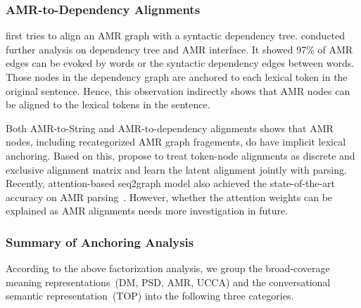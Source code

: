 \subsubsection{AMR-to-Dependency Alignments}
\label{sssec:lex-phr:amr-dep}
\citet{chen2017unsupervised} first tries to align an AMR graph with a
syntactic dependency tree.  \citet{szubert2018structured} conducted
further analysis on dependency tree and AMR interface. It showed 97\%
of AMR edges can be evoked by words or the syntactic dependency edges
between words.  Those nodes in the dependency graph are anchored to
each lexical token in the original sentence. Hence, this observation
indirectly shows that AMR nodes can be aligned to the lexical tokens
in the sentence.

Both AMR-to-String and AMR-to-dependency alignments shows that AMR
nodes, including recategorized AMR graph fragements, do have implicit
lexical anchoring. Based on this, \citet{lyu2018amr} propose to treat
token-node alignments as discrete and exclusive alignment matrix and
learn the latent alignment jointly with parsing. Recently,
attention-based seq2graph model also achieved the state-of-the-art
accuracy on AMR parsing~\citep{zhang-etal-2018-stog}.  However, whether
the attention weights can be explained as AMR alignments needs more
investigation in future.

\subsubsection{Summary of Anchoring Analysis}
\label{sssec:lex-phr:sum-anchoring}
According to the above factorization analysis, we group the
broad-coverage meaning representations~(DM, PSD, AMR, UCCA) and the
conversational semantic representation~(TOP) into the following three
categories.

